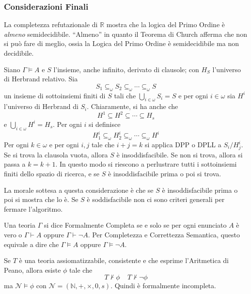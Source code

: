 \subsubsection{Considerazioni Finali}
La completezza refutazionale di $\mathbb{R}$ mostra che la logica del Primo Ordine è \textit{almeno} semidecidibile. ``Almeno'' in quanto il Teorema di Church afferma che non si può fare di meglio, ossia la Logica del Primo Ordine è semidecidibile ma non decidibile. 

Siano $\Gamma \models A$ e $S$ l'insieme, anche infinito, derivato di clausole; con $H_S$ l'universo di Herbrand relativo.
Sia 
$$
S_1 \subseteq_{\omega} S_2 \subseteq_{\omega} \cdots \subseteq_{\omega}S
$$
un insieme di sottoinsiemi finiti di $S$ tali che $\bigcup_{i \in \omega} S_i = S$ e per ogni $i \in \omega$ sia $H^i$ l'universo di Herbrand di $S_i$. Chiaramente, si ha anche che 
$$
H^1 \subseteq H^2 \subseteq \cdots \subseteq H_s
$$
e $\bigcup_{i \in \omega} H^i = H_s$. Per ogni $i$ si definisce 
$$
H_1^i \subseteq_{\omega} H_2^i \subseteq_{\omega}\cdots \subseteq_{\omega} H^i
$$
Per ogni $k \in \omega$ e per ogni $i,j$ tale che $i+j = k$ si applica DPP o DPLL a $S_i/H_j^i$. 
Se si trova la clausola vuota, allora $S$ è insoddisfacibile. Se non si trova, 
allora si passa a $k=k+1$. In questo modo si riescono a perlustrare tutti i sottoinsiemi 
finiti dello spazio di ricerca, e se $S$ è insoddisfacibile prima o poi si trova. 

La morale sottesa a questa considerazione è che se $S$ è insoddisfacibile 
prima o poi si mostra che lo è. Se $S$ è soddisfacibile non ci sono criteri generali 
per fermare l'algoritmo. 


\begin{defi}
        Una teoria $\Gamma$ si dice Formalmente Completa se e solo se per 
        ogni enunciato $A$ è vero o $\Gamma \vdash A$ oppure $\Gamma \vdash \neg A$. 
        Per Completezza e Correttezza Semantica, questo equivale a dire 
        che $\Gamma \models A$ oppure $\Gamma \models \neg A$.
\end{defi}

\begin{teo}
        Se $T$ è una teoria assiomatizzabile, consistente e che esprime 
        l'Aritmetica di Peano, allora esiste $\phi$ tale che 
        $$
        T \nvdash \phi ~~~~~ T \nvdash \neg \phi
        $$
        ma $\mathscr{N} \models \phi$ con $\mathscr{N} = (\mathbb{N}, +, \times, 0, s)$. Quindi è formalmente incompleta.
\end{teo}

